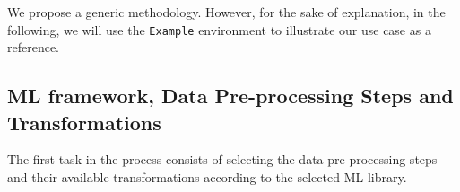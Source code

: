 We propose a generic methodology.
However, for the sake of explanation, in the following, we will use the \texttt{Example} environment to illustrate our use case as a reference.



\subsection{ML framework, Data Pre-processing Steps and Transformations}
\label{effective-ssec:select-framework}

The first task in the process consists of selecting the data pre-processing steps and their available transformations according to the selected ML library.

